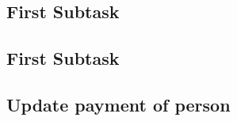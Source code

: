 \documentclass[a4paper]{article}
\begin{document}
\subsection{First Subtask}
\subsection{First Subtask}
\subsection{Update payment of person}


\bigskip

\end{document}
